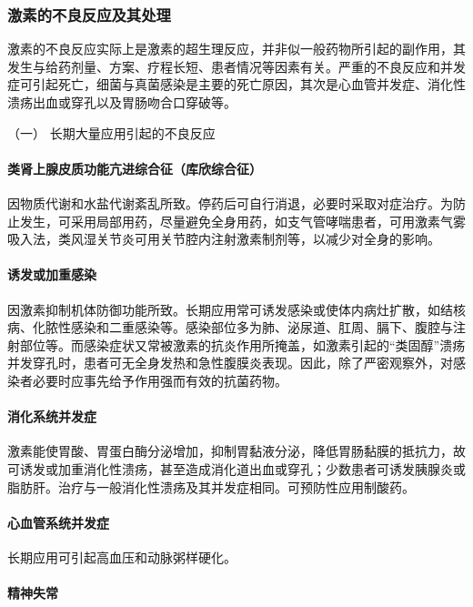\subsubsection{激素的不良反应及其处理}

激素的不良反应实际上是激素的超生理反应，并非似一般药物所引起的副作用，其发生与给药剂量、方案、疗程长短、患者情况等因素有关。严重的不良反应和并发症可引起死亡，细菌与真菌感染是主要的死亡原因，其次是心血管并发症、消化性溃疡出血或穿孔以及胃肠吻合口穿破等。

\hypertarget{text00428.htmlux5cux23CHP17-6-5-1}{}
（一） 长期大量应用引起的不良反应

\paragraph{类肾上腺皮质功能亢进综合征（库欣综合征）}

因物质代谢和水盐代谢紊乱所致。停药后可自行消退，必要时采取对症治疗。为防止发生，可采用局部用药，尽量避免全身用药，如支气管哮喘患者，可用激素气雾吸入法，类风湿关节炎可用关节腔内注射激素制剂等，以减少对全身的影响。

\paragraph{诱发或加重感染}

因激素抑制机体防御功能所致。长期应用常可诱发感染或使体内病灶扩散，如结核病、化脓性感染和二重感染等。感染部位多为肺、泌尿道、肛周、膈下、腹腔与注射部位等。而感染症状又常被激素的抗炎作用所掩盖，如激素引起的“类固醇”溃疡并发穿孔时，患者可无全身发热和急性腹膜炎表现。因此，除了严密观察外，对感染者必要时应事先给予作用强而有效的抗菌药物。

\paragraph{消化系统并发症}

激素能使胃酸、胃蛋白酶分泌增加，抑制胃黏液分泌，降低胃肠黏膜的抵抗力，故可诱发或加重消化性溃疡，甚至造成消化道出血或穿孔；少数患者可诱发胰腺炎或脂肪肝。治疗与一般消化性溃疡及其并发症相同。可预防性应用制酸药。

\paragraph{心血管系统并发症}

长期应用可引起高血压和动脉粥样硬化。

\paragraph{精神失常}

